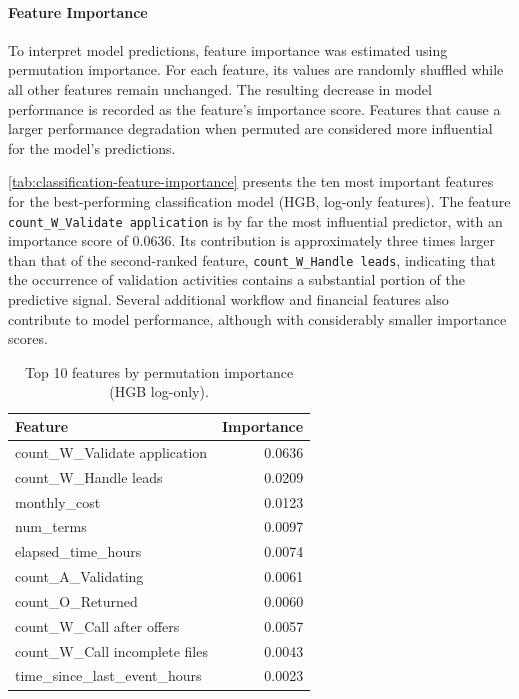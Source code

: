 \documentclass[runningheads]{llncs}
\begin{document}
\paragraph{Feature Importance}
To interpret model predictions, feature importance was estimated using permutation importance. For each feature, its values are randomly shuffled while all other features remain unchanged. The resulting decrease in model performance is recorded as the feature's importance score. Features that cause a larger performance degradation when permuted are considered more influential for the model's predictions. \cite{Breiman2001}

\autoref{tab:classification-feature-importance} presents the ten most important features for the best-performing classification model (HGB, log-only features). The feature \texttt{count\_W\_Validate application} is by far the most influential predictor, with an importance score of 0.0636. Its contribution is approximately three times larger than that of the second-ranked feature, \texttt{count\_W\_Handle leads}, indicating that the occurrence of validation activities contains a substantial portion of the predictive signal. Several additional workflow and financial features also contribute to model performance, although with considerably smaller importance scores.

\begin{table}[H]
    \centering
    \caption{Top 10 features by permutation importance (HGB log-only).}
    \label{tab:classification-feature-importance}
    \begin{tabular}{lr}
        \toprule
        Feature & Importance \\
        \midrule
        count\_W\_Validate application        & 0.0636 \\
        count\_W\_Handle leads                & 0.0209 \\
        monthly\_cost                         & 0.0123 \\
        num\_terms                            & 0.0097 \\
        elapsed\_time\_hours                  & 0.0074 \\
        count\_A\_Validating                  & 0.0061 \\
        count\_O\_Returned                    & 0.0060 \\
        count\_W\_Call after offers           & 0.0057 \\
        count\_W\_Call incomplete files       & 0.0043 \\
        time\_since\_last\_event\_hours       & 0.0023 \\
        \bottomrule
    \end{tabular}
\end{table}
\end{document}
